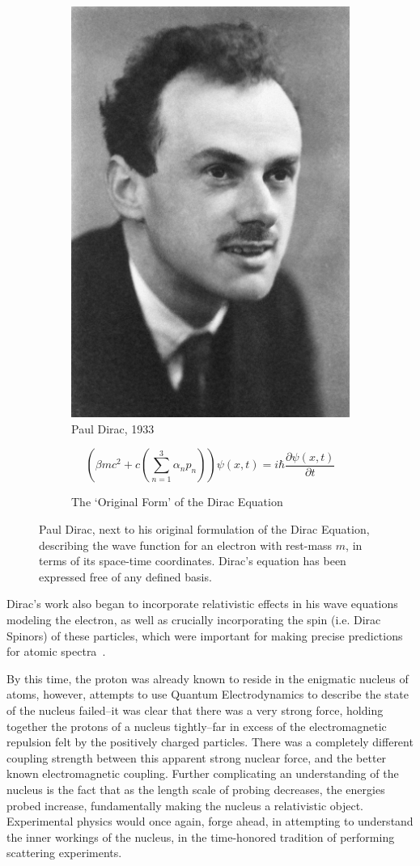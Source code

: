 \begin{figure}[ht]
	\centering
	\begin{subfigure}{.4\textwidth}
		\centering
		\includegraphics[width=0.4\linewidth]{./figures/pauldirac.jpg}
		\caption{Paul Dirac, 1933  \cite{NobelFoundation1933}}
		\label{fig:pauldirac}
	\end{subfigure}%
	\begin{subfigure}{0.6\textwidth}
		\centering
		\begin{equation}
			\left(\beta mc^2 + c\left(\sum_{n \mathop =1}^{3}\alpha_n p_n\right)\right) \psi (x,t) = i \hbar \frac{\partial\psi(x,t) }{\partial t}
		\end{equation}
		\caption{The `Original Form' of the Dirac Equation}
		\label{eq:diracquation}
	\end{subfigure}
	\caption{ 
		Paul Dirac, next to his original formulation of the Dirac Equation,
		describing the wave function for an electron with rest-mass $m$, in terms of
		its space-time coordinates. Dirac's equation has been expressed free of any
    defined basis.
	}
	\label{fig:thomsonrays}
\end{figure}

Dirac's work also began to incorporate relativistic effects in his wave
equations modeling the electron, as well as crucially incorporating the spin
(i.e. Dirac Spinors) of these particles, which were important for making precise
predictions for atomic spectra~\cite{Dirac}.

By this time, the proton was already known to reside in the enigmatic nucleus of
atoms, however, attempts to use Quantum Electrodynamics to describe the state of
the nucleus failed--it was clear that there was a very strong force, holding
together the protons of a nucleus tightly--far in excess of the electromagnetic
repulsion felt by the positively charged particles. There was a completely
different coupling strength between this apparent strong nuclear force, and the
better known electromagnetic coupling. Further complicating an understanding of
the nucleus is the fact that as the length scale of probing decreases, the
energies probed increase, fundamentally making the nucleus a relativistic
object. Experimental physics would once again, forge ahead, in attempting to
understand the inner workings of the nucleus, in the time-honored tradition of
performing scattering experiments.

